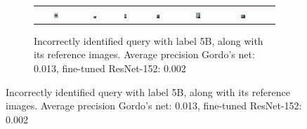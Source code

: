 \begin{figure}
\begin{subfigure}{\textwidth}
\begin{tabular}{|c|*{6}{c}}
\includegraphics[width=0.12\textwidth]{img/5B-0506.JPG} &
\includegraphics[width=0.12\textwidth]{img/5B-0.JPG} &
\includegraphics[width=0.12\textwidth]{img/5B-1.JPG} &
\includegraphics[width=0.12\textwidth]{img/5B-2.JPG} &
\includegraphics[width=0.12\textwidth]{img/5B-3.JPG} &
\includegraphics[width=0.12\textwidth]{img/5B-4.JPG} \\
\end{tabular}
\caption{Incorrectly identified query with label 5B,
along with its reference images.\newline
Average precision Gordo's net: 0.013, fine-tuned ResNet-152: 0.002
\label{fig:incorrect5B}}
\end{subfigure}


\end{figure}

